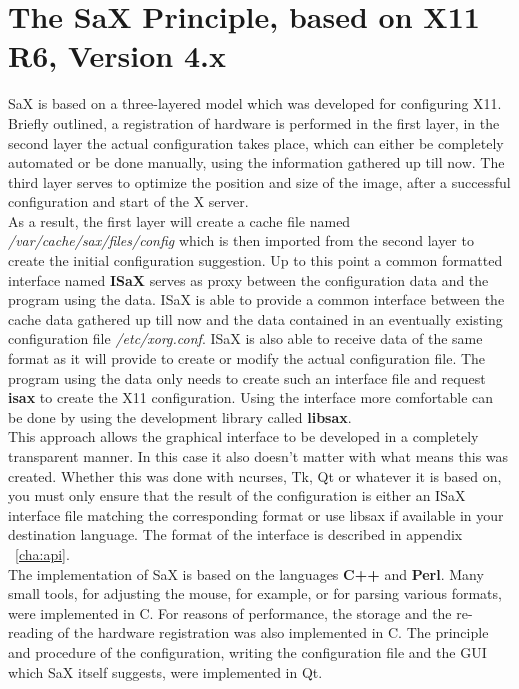 \chapter{The SaX Principle, based on X11 R6, Version 4.x}
\label{cha:dsp}
\minitoc
SaX is based on a three-layered model which was
developed for configuring X11. Briefly outlined, a registration of
hardware is performed in the first layer, in the second layer the actual
configuration takes place, which can either be completely automated or be
done manually, using the information gathered up till now. The third layer
serves to optimize the position and size of the image, after a successful
configuration and start of the X server.\\

As a result, the first layer will create a cache file named
\textit{/var/cache/sax/files/config} which is then imported from the second
layer to create the initial configuration suggestion. Up to this point
a common formatted interface named \textbf{ISaX} serves as proxy between
the configuration data and the program using the data. ISaX is able to
provide a common interface between the cache data gathered up till now and
the data contained in an eventually existing configuration file
\textit{/etc/xorg.conf}. ISaX is also able to receive data of the same
format as it will provide to create or modify the actual configuration
file. The program using the data only needs to create such an interface
file and request \textbf{isax} to create the X11 configuration. Using the
interface more comfortable can be done by using the development
library called \textbf{libsax}.\\

This approach allows the graphical interface to be developed in a completely
transparent manner. In this case it also doesn't matter with what means
this was created. Whether this was done with ncurses, Tk, Qt or whatever it
is based on, you must only ensure that the result of the configuration is 
either an ISaX interface file matching the corresponding format or use libsax
if available in your destination language. The format of the interface is
described in appendix ~\ref{cha:api}.\\

The implementation of SaX is based on the languages 
\textbf{C++} and \textbf{Perl}. Many small tools, for adjusting the mouse, for
example, or for parsing various formats, were implemented in C. For reasons of
performance, the storage and the re-reading of the hardware registration was
also implemented in C. The principle and procedure of the configuration,
writing the configuration file and the GUI which SaX itself suggests, were
implemented in Qt.

